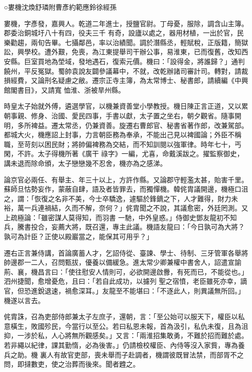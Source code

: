 
\begin{pinyinscope}

 ○婁機沈煥舒璘附曹彥約範應鈴徐經孫



 婁機，字彥發，嘉興人。乾道二年進士，授鹽官尉。丁母憂，服除，調含山主簿。郡委治銅城圩八十有四，役夫三千
 有奇，設廬以處之，器用材植，一出於官，民樂勸趨，兩旬告畢。七攝鄰邑，率以治績聞。調於潛縣丞，輕賦稅，正版籍，簡獄訟，興學校。遭外艱，免喪，為江東提舉司干辦公事，易淮東，已而復舊，改知西安縣。巨室買地為塋域，發地遇石，復索元價。機曰：「設得金，將誰歸？」通判饒州，平反冤獄。蜀帥袁說友闢參議幕中，不就，改乾辦諸司審計司。轉對，請裁損經費，又論刑名疑慮之敝。遷宗正寺主簿，為太常博士、秘書郎，請續編《中興館閣書目》，又請寬
 恤淮、浙被旱州縣。



 時皇太子始就外傅，遴選學官，以機兼資善堂小學教授。機日陳正言正道，又以累朝事親、修身、治國、愛民四事，手書以獻，太子置之坐右，朝夕觀省。隨事開明，多所裨益。遷太常丞，仍兼資善。旋遷右曹郎官、秘書省著作郎，改兼駕部。都城大火，機應詔上封事，力言朝臣務為奉承，不能出己見以裨國論；外臣不稱職，至苛刻以困民財；將帥偏裨務為交結，而不知訓閱以強軍律。時年七十，丐閑，不許。太子得機所著《廣干
 祿字》一編，尤喜，命戴溪跋之。擢監察御史，講未退而除命頒，太子戀戀幾不忍舍，機亦為之感涕。



 論京官必兩任、有舉主、年三十以上，方許作縣。又論郡守輕濫太甚，貽害千里。蘇師旦怙勢妄作，蒙蔽自肆，語及者皆罪去，而獨憚機。韓侂胄議開邊，機極口沮之，謂：「恢復之名非不美，今士卒驕逸，遽驅於鋒鏑之下，人才難得，財力未裕，萬一兵連禍結，久而不解，奈何？」侂胄聞之不說，其議愈密，外廷罔測。又上疏極論：「雖密謀人莫得知，而羽書
 一馳，中外皇惑。」侍御史鄧友龍初不知兵，騰書投合，妄薦大將，既召還，專主此議。機語友龍曰：「今日孰可為大將？孰可為計臣？正使以殿巖當之，能保其可用乎？」



 遷右正言兼侍講，首論廣蓄人才，乞詔侍從、臺諫、學士、待制、三牙管軍各舉將帥邊郡一二人，召問甄拔，優養以備緩急。進太常少卿兼權中書舍人，詔遣宣諭荊、襄，機昌言曰：「使往慰安人情則可，必欲開邊啟釁，有死而已，不能從也。」泗州捷聞，愈增憂危，且曰：「若自此成功，以攄列
 聖之宿憤，老臣雖死亦幸，謫官，但恐進銳退速，禍愈深耳。」友龍至不能堪曰：「不逐此人，則異議無所回。」機遂以言去。



 侂胄誅，召為吏部侍郎兼太子左庶子，還朝，言：「至公始可以服天下，權臣以私意橫生，敗國殄民，今當行以至公。若曰私恩未報，首為汲引，私仇未復，且為沮抑，一涉於私，人心將無所觀感矣。」又言：「兩淮招集敢勇，不難於招而難於處。若非繩以紀律，課其勤惰，必為後害。」仍請檢校權臣、內侍等沒入家貲，專為養兵之助。機
 裏人有故官吏部，喪未舉而子赴調者，機謂彼既冒法禁，而部胥不之問，即撻數吏，使之治葬而後來。聞者韙之。




\end{pinyinscope}
